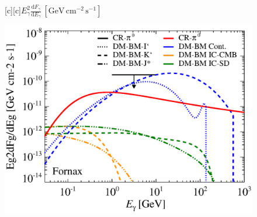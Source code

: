 \documentclass[dvips]{article}
\begin{document}
\pagestyle{empty}

\newcommand{\size}{\Large}%

\begin{figure}
  [c][c]{\size $E_\gamma^2\frac{\mathrm{d}F_\gamma}{\mathrm{d}E_\gamma}\,[\mathrm{GeV}\,\mathrm{cm}^{-2}\,\mathrm{s}^{-1}]$}
  
    \includegraphics[width=\textwidth]{flux.BMcomp.v8.0.1deg.1.6T.SubMass.IR2.noMW.woGal_raw.eps}
\end{figure}
\end{document}
